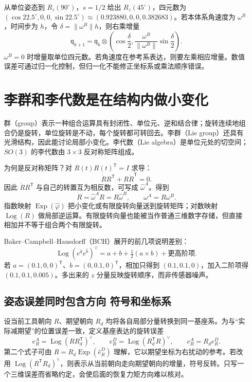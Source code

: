 从单位姿态到 $R_z(90^\circ)$，$s=1/2$ 给出 $R_z(45^\circ)$，四元数为 $(\cos22.5^\circ,0,0,\sin22.5^\circ)\approx(0.923880,0,0,0.382683)$。若本体系角速度为 $\omega^B$，时间步为 $h$，令 $\delta=\|\omega^B\|h$，则右乘增量
\begin{equation}
 \mathsf q_{k+1}=\mathsf q_k\otimes
 \left(\cos\frac\delta2,
 \frac{\omega^B}{\|\omega^B\|}\sin\frac\delta2\right).
\end{equation}
$\omega^B=0$ 时增量取单位四元数。若角速度在参考系表达，则要左乘相应增量。数值误差可通过归一化控制，但归一化不能修正坐标系或乘法顺序错误。

\section{李群和李代数是在结构内做小变化}
群（group）表示一种组合运算具有封闭性、单位元、逆和结合律；旋转连续地组合仍是旋转，单位旋转是不动，每个旋转都可转回去。李群（Lie group）还具有光滑结构，因此能讨论局部小变化。李代数（Lie algebra）是单位元处的切空间；$SO(3)$ 的李代数由 $3\times3$ 反对称矩阵组成。

为何是反对称矩阵？对 $R(t)R(t)^\mathsf T=I$ 求导：
\begin{equation}
 \dot R R^\mathsf T+R\dot R^\mathsf T=0.
\end{equation}
因此 $\dot R R^\mathsf T$ 与自己的转置互为相反数，可写成 $\widehat\omega^A$。得到
\begin{equation}
 \dot R=\widehat\omega^A R=R\widehat\omega^B,
 \qquad\omega^A=R\omega^B.
\end{equation}
指数映射 $\operatorname{Exp}(\widehat\varphi)$ 把小变化或有限旋转向量送到旋转矩阵；对数映射 $\operatorname{Log}(R)$ 做局部逆运算。有限旋转向量也能被当作普通三维数字存储，但直接相加并不等于组合两个有限旋转。

Baker--Campbell--Hausdorff（BCH）展开的前几项说明差别：
\begin{equation}
 \operatorname{Log}\left(e^{\widehat a}e^{\widehat b}\right)^\vee
 =a+b+\tfrac12(a\times b)+\text{更高阶项}.
\end{equation}
若 $a=(0.1,0,0)^\mathsf T$、$b=(0,0.1,0)^\mathsf T$，相加只得到 $(0.1,0.1,0)$，加入二阶项得 $(0.1,0.1,0.005)$。多出来的 $z$ 分量反映旋转顺序，而非传感器噪声。

\subsection{姿态误差同时包含方向 符号和坐标系}
设当前工具朝向 $R$、期望朝向 $R_d$ 均将各自局部分量转换到同一基座系。为与“实际减期望”的位置误差一致，定义基座表达的旋转误差
\begin{equation}
 e_R^A=\operatorname{Log}(RR_d^\mathsf T)^\vee,
 \qquad
 e_R^D=\operatorname{Log}(R_d^\mathsf TR)^\vee,
 \qquad e_R^A=R_d e_R^D.
\end{equation}
第二个式子可由 $R=R_d\operatorname{Exp}(\widehat e_R^D)$ 理解，它以期望坐标为右扰动的参考。若改用 $\operatorname{Log}(R^\mathsf TR_d)^\vee$，则表示从当前朝向走向期望朝向的增量，符号反转。只写一个三维误差而省略约定，会使后面的恢复力矩方向难以核对。


